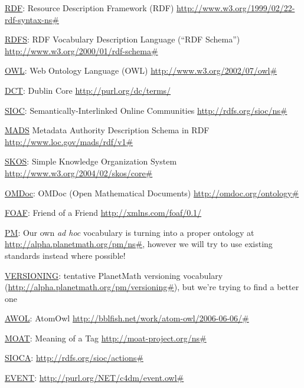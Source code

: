 \documentclass{article}
\begin{document}
\begin{compactitem}
\item \href{http://www.w3.org/TR/rdf-concepts/}{RDF}: Resource Description Framework (RDF) \url{http://www.w3.org/1999/02/22-rdf-syntax-ns#}
\item \href{http://www.w3.org/TR/2004/REC-rdf-schema-20040210/}{RDFS}: RDF Vocabulary Description Language (``RDF Schema'') \url{http://www.w3.org/2000/01/rdf-schema#}
\item \href{http://www.w3.org/TR/2009/REC-owl2-overview-20091027/}{OWL}: Web Ontology Language (OWL) \url{http://www.w3.org/2002/07/owl#}
\item \href{http://dublincore.org/documents/dces/}{DCT}: Dublin Core \url{http://purl.org/dc/terms/}
\item \href{http://sioc-project.org/ontology}{SIOC}: Semantically-Interlinked Online Communities \url{http://rdfs.org/sioc/ns#}
\item \href{http://www.loc.gov/standards/mads/rdf/}{MADS} Metadata Authority Description Schema in RDF \url{http://www.loc.gov/mads/rdf/v1#}
\item \href{http://www.w3.org/TR/skos-reference/skos.html}{SKOS}: Simple Knowledge Organization System \url{http://www.w3.org/2004/02/skos/core#}
\item \href{http://kwarc.info/projects/docOnto/omdoc.html}{OMDoc}: OMDoc (Open Mathematical Documents) \url{http://omdoc.org/ontology#}
\item \href{http://xmlns.com/foaf/spec/}{FOAF}: Friend of a Friend \url{http://xmlns.com/foaf/0.1/}
\item \href{http://alpha.planetmath.org/spec/}{PM}: Our own \emph{ad hoc} vocabulary is turning into a proper ontology at \url{http://alpha.planetmath.org/pm/ns#}, however we will try to use existing standards instead where possible!
\item \href{http://alpha.planetmath.org/spec/}{VERSIONING}: tentative PlanetMath versioning vocabulary (\url{http://alpha.planetmath.org/pm/versioning#}), but we're trying to find a better one
\item \href{http://bblfish.net/work/atom-owl/2006-06-06/AtomOwl.html}{AWOL}: AtomOwl \url{http://bblfish.net/work/atom-owl/2006-06-06/#}
\item \href{http://moat-project.org/ontology}{MOAT}: Meaning of a Tag \url{http://moat-project.org/ns#}
\item \href{http://liris.cnrs.fr/Documents/Liris-4737-slides-sioca.pdf}{SIOCA}: \url{http://rdfs.org/sioc/actions#}
\item \href{http://motools.sourceforge.net/event/event.html}{EVENT}: \url{http://purl.org/NET/c4dm/event.owl#}

\end{compactitem}
\end{document}
